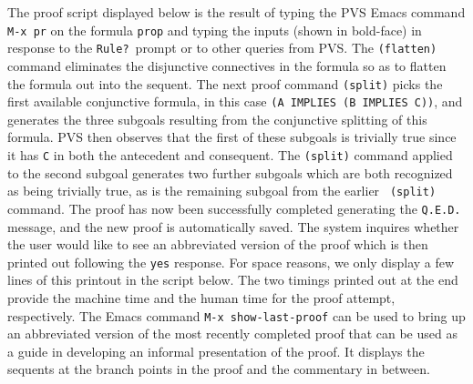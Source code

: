The proof script displayed below is the result of typing the PVS Emacs
command {\tt M-x pr} on the formula {\tt prop} and typing the inputs
(shown in bold-face) in response to the {\tt Rule?}\ prompt or to other
queries from PVS.  The {\tt (flatten)} command eliminates the
disjunctive connectives in the formula so as to flatten the formula out
into the sequent.  The next proof command {\tt (split)} picks the first
available conjunctive formula, in this case {\tt (A IMPLIES (B IMPLIES
C))}, and generates the three subgoals resulting from the conjunctive
splitting of this formula.  PVS then observes that the first of these
subgoals is trivially true since it has {\tt C} in both the antecedent
and consequent.  The {\tt (split)} command applied to the second subgoal
generates two further subgoals which are both recognized as being
trivially true, as is the remaining subgoal from the earlier {\tt
(split)} command.  The proof has now been successfully completed
generating the {\tt Q.E.D.} message, and  the new proof is automatically
saved.  The system inquires whether the user would like to see an
abbreviated version of the proof which is then printed out following the
{\tt yes} response.  For space reasons, we only display a few lines of
this printout in the script below.  The two timings printed out at the
end provide the machine time and the human time for the
proof attempt,  respectively.  The Emacs command {\tt M-x
show-last-proof} can be used to bring up an abbreviated version
of the most recently completed proof that can be used as a guide
in developing an informal presentation of the proof.  It displays
the sequents at the branch points in the proof and the commentary in
between.  


